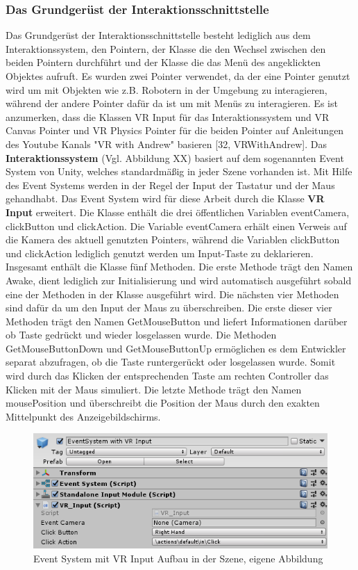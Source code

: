 \subsubsection{Das Grundgerüst der Interaktionsschnittstelle}\label{sec:GrundgerüstInteraktion}
Das Grundgerüst der Interaktionsschnittstelle besteht lediglich aus dem Interaktionssystem, den Pointern, der Klasse die den Wechsel zwischen den beiden Pointern durchführt und der Klasse die das Menü des angeklickten Objektes aufruft. Es wurden zwei Pointer verwendet, da der eine Pointer genutzt wird um mit Objekten wie z.B. Robotern in der Umgebung zu interagieren, während der andere Pointer dafür da ist um mit Menüs zu interagieren. Es ist anzumerken, dass die Klassen VR Input für das Interaktionssystem und VR Canvas Pointer und VR Physics Pointer für die beiden Pointer auf Anleitungen des Youtube Kanals "VR with Andrew" basieren [32, VRWithAndrew].
\newline\newline
Das \textbf{Interaktionssystem} (Vgl. Abbildung XX) basiert auf dem sogenannten Event System von Unity, welches standardmäßig in jeder Szene vorhanden ist. Mit Hilfe des Event Systems werden in der Regel der Input der Tastatur und der Maus gehandhabt. Das Event System wird für diese Arbeit durch die Klasse \textbf{VR Input} erweitert. Die Klasse enthält die drei öffentlichen Variablen eventCamera, clickButton und clickAction. Die Variable eventCamera erhält einen Verweis auf die Kamera des aktuell genutzten Pointers, während die Variablen clickButton und clickAction lediglich genutzt werden um Input-Taste zu deklarieren.
\newline
Insgesamt enthält die Klasse fünf Methoden. Die erste Methode trägt den Namen Awake, dient lediglich zur Initialisierung und wird automatisch ausgeführt sobald eine der Methoden in der Klasse ausgeführt wird. Die nächsten vier Methoden sind dafür da um den Input der Maus zu überschreiben. Die erste dieser vier Methoden trägt den Namen GetMouseButton und liefert Informationen darüber ob Taste gedrückt und wieder losgelassen wurde. Die Methoden GetMouseButtonDown und GetMouseButtonUp ermöglichen es dem Entwickler separat abzufragen, ob die Taste runtergerückt oder losgelassen wurde. Somit wird durch das Klicken der entsprechenden Taste am rechten Controller das Klicken mit der Maus simuliert. Die letzte Methode trägt den Namen mousePosition und überschreibt die Position der Maus durch den exakten Mittelpunkt des Anzeigebildschirms.
\begin{figure}[h]
	\centering
	\includegraphics[width=0.5\linewidth]{Bilder/A41_EventSystem}
	\caption{Event System mit VR Input Aufbau in der Szene, eigene Abbildung}
	\label{fig:EventSystem}
\end{figure}
